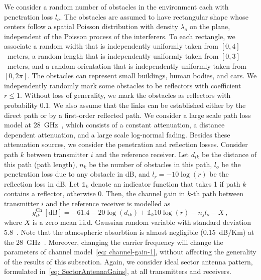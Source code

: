 \documentclass[12pt, draftclsnofoot, onecolumn]{IEEEtran}
\begin{document}
We consider a random number of obstacles in the environment each with penetration loss $l_o$. The obstacles are assumed to have rectangular shape whose centers follow a spatial Poisson distribution with density $\lambda_o$ on the plane, independent of the Poisson process of the interferers. To each rectangle, we associate a random width that is independently uniformly taken from $[0,4]$~meters, a random length that is independently uniformly taken from $[0,3]$~meters, and a random orientation that is independently uniformly taken from $[0,2\pi]$. The obstacles can represent small buildings, human bodies, and cars. We independently randomly mark some obstacles to be reflectors with coefficient $r \leq 1 $. Without loss of generality, we mark the obstacles as reflectors with probability 0.1. We also assume that the links can be established either by the direct path or by a first-order reflected path. We consider a large scale path loss model at 28~GHz~\cite{Akdeniz2014MillimeterWave}, which consists of a constant attenuation, a distance dependent attenuation, and a large scale log-normal fading. Besides these attenuation sources, we consider the penetration and reflection losses. Consider path $k$ between transmitter $i$ and the reference receiver. Let $d_{ik}$ be the distance of this path (path length), $n_k$ be the number of obstacles in this path, $l_o$ be the penetration loss due to any obstacle in dB, and $l_r = -10\log(r)$ be the reflection loss in dB. Let $\mathds{1}_k$ denote an indicator function that takes 1 if path $k$ contains a reflector, otherwise 0. Then, the channel gain in $k$-th path between transmitter $i$ and the reference receiver is modelled as
\begin{equation}\label{eq: channel-gain-1}
g_{ik}^{\mathrm{Ch}} \:  [\mbox{dB}]= -61.4 - 20\log(d_{ik}) + \mathds{1}_k 10\log(r) - n_j l_{o} - X \:,
\end{equation}
where $X$ is a zero mean i.i.d. Gaussian random variable with standard deviation $5.8$~\cite{Akdeniz2014MillimeterWave}. Note that the atmospheric absorbtion is almost negligible (0.15~dB/Km) at the 28~GHz~\cite{Rangan2014Millimeter}. Moreover, changing the carrier frequency will change the parameters of channel model~\eqref{eq: channel-gain-1}, without affecting the generality of the results of this subsection. Again, we consider ideal sector antenna pattern, formulated in~\eqref{eq: SectorAntennaGains}, at all transmitters and receivers.
\end{document}
